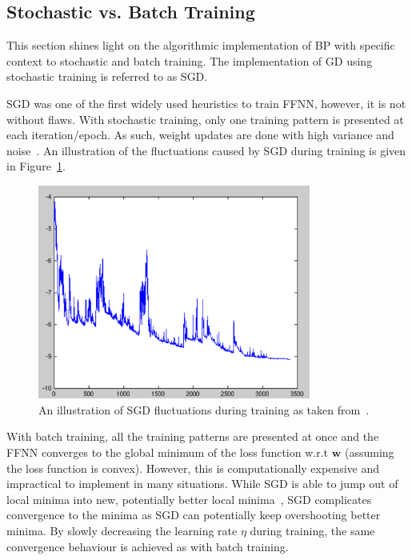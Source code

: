 \subsection{Stochastic vs. Batch Training}\label{sec:heuristics:gd:sgd}

This section shines light on the algorithmic implementation of \acs{BP} with specific context to stochastic and batch training. The implementation of \acs{GD} using stochastic training is referred to as \acf{SGD}.

\acs{SGD} was one of the first widely used heuristics to train \acs{FFNN}, however, it is not without flaws. With stochastic training, only one training pattern is presented at each iteration/epoch. As such, weight updates are done with high variance and noise~\cite{ref:ruder:2016}. An illustration of the fluctuations caused by \acs{SGD} during training is given in Figure~\ref{fig:heuristics:gd:sgd}.

\begin{figure}[htbp]
	\centering
	\includegraphics[width=0.8\textwidth]{images/sgd.pdf}
	\caption{An illustration of \acf{SGD} fluctuations during training as taken from~\cite{ref:sgd:2006}.}
	\label{fig:heuristics:gd:sgd}
\end{figure}

With batch training, all the training patterns are presented at once and the \acs{FFNN} converges to the global minimum of the loss function w.r.t $\boldsymbol{w}$ (assuming the loss function is convex). However, this is computationally expensive and impractical to implement in many situations. While \acs{SGD} is able to jump out of local minima into new, potentially better local minima~\cite{ref:ruder:2016}, \acs{SGD} complicates convergence to the minima as \acs{SGD} can potentially keep overshooting better minima. By slowly decreasing the learning rate $\eta$ during training, the same convergence behaviour is achieved as with batch training.

